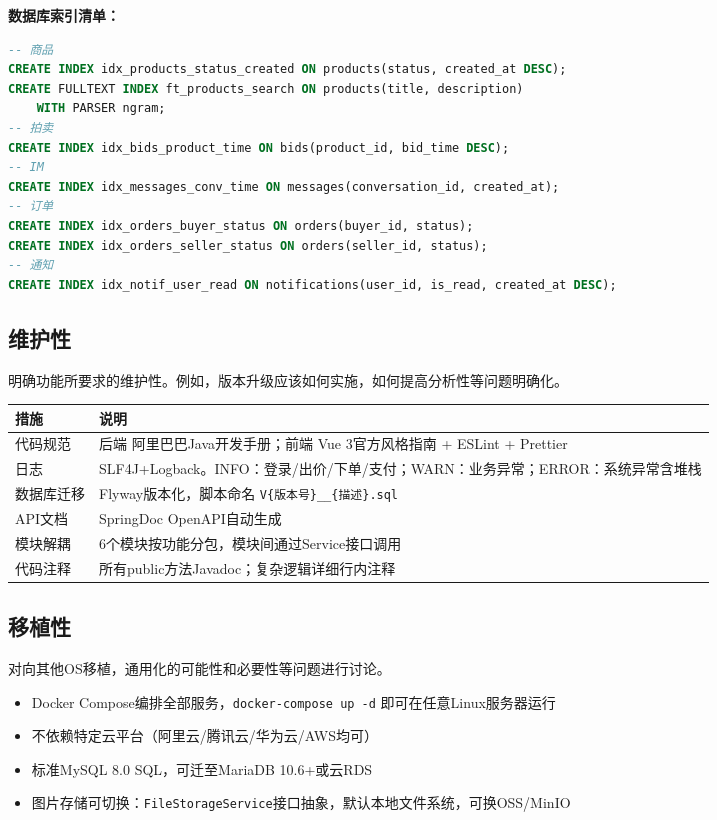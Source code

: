 \documentclass[12pt,a4paper]{ctexart}
\numberwithin{figure}{section}
\numberwithin{table}{section}
\begin{document}
\textbf{数据库索引清单：}

\begin{lstlisting}[language=sql]
-- 商品
CREATE INDEX idx_products_status_created ON products(status, created_at DESC);
CREATE FULLTEXT INDEX ft_products_search ON products(title, description)
    WITH PARSER ngram;
-- 拍卖
CREATE INDEX idx_bids_product_time ON bids(product_id, bid_time DESC);
-- IM
CREATE INDEX idx_messages_conv_time ON messages(conversation_id, created_at);
-- 订单
CREATE INDEX idx_orders_buyer_status ON orders(buyer_id, status);
CREATE INDEX idx_orders_seller_status ON orders(seller_id, status);
-- 通知
CREATE INDEX idx_notif_user_read ON notifications(user_id, is_read, created_at DESC);
\end{lstlisting}

\subsection{维护性}

明确功能所要求的维护性。例如，版本升级应该如何实施，如何提高分析性等问题明确化。

\begin{center}
\renewcommand{\arraystretch}{1.3}
\begin{tabular}{|p{3cm}|p{11cm}|}
\hline
\rowcolor{tableheader}
\textbf{措施} & \textbf{说明} \\
\hline
代码规范 & 后端 阿里巴巴Java开发手册；前端 Vue 3官方风格指南 + ESLint + Prettier \\
\hline
日志 & SLF4J+Logback。INFO：登录/出价/下单/支付；WARN：业务异常；ERROR：系统异常含堆栈 \\
\hline
数据库迁移 & Flyway版本化，脚本命名 \verb|V{版本号}__{描述}.sql| \\
\hline
API文档 & SpringDoc OpenAPI自动生成 \\
\hline
模块解耦 & 6个模块按功能分包，模块间通过Service接口调用 \\
\hline
代码注释 & 所有public方法Javadoc；复杂逻辑详细行内注释 \\
\hline
\end{tabular}
\end{center}

\subsection{移植性}

对向其他OS移植，通用化的可能性和必要性等问题进行讨论。

\begin{itemize}
    \item Docker Compose编排全部服务，\verb|docker-compose up -d| 即可在任意Linux服务器运行
    \item 不依赖特定云平台（阿里云/腾讯云/华为云/AWS均可）
    \item 标准MySQL 8.0 SQL，可迁至MariaDB 10.6+或云RDS
    \item 图片存储可切换：\verb|FileStorageService|接口抽象，默认本地文件系统，可换OSS/MinIO
\end{itemize}
\end{document}
